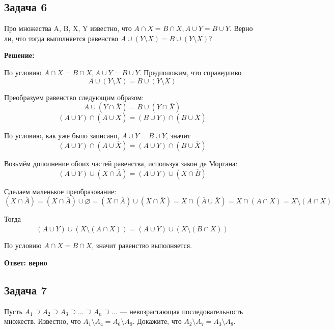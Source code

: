 \documentclass[a4paper,14pt]{article} %
\begin{document}
\newpage
\begin{center}
\subsection{Задача 6}
\end{center}

Про множества A, B, X, Y известно, что $A \cap X = B \cap X, A \cup Y = B \cup Y .$ Верно ли, что тогда выполняется равенство $A \cup (Y \setminus X) = B \cup (Y \setminus X)$?
\begin{center}
\bfseries
{\Large Решение: }
\end{center}


По условию $A\cap X = B\cap X, A\cup Y = B\cup Y$. Предположим, что справедливо
\[A \cup (Y \setminus X) = B \cup (Y \setminus X)\]

Преобразуем равенство следующим образом:
\[A \cup (Y \cap \overline{X}) = B \cup (Y \cap \overline{X})\]
\[(A \cup Y) \cap (A \cup \overline{X}) = (B \cup Y) \cap (B \cup \overline{X})\]

По условию, как уже было записано, $A\cup Y = B\cup Y$, значит
\[(A \cup Y) \cap (A \cup \overline{X}) = (A \cup Y) \cap (B \cup \overline{X})\]

Возьмём дополнение обоих частей равенства, используя закон де Моргана:
\[\overline{(A \cup Y)} \cup (X \cap \overline{A}) = \overline{(A \cup Y)} \cup (X \cap \overline{B})\]

Сделаем маленькое преобразование:
\[(X \cap \overline{A}) = (X \cap \overline{A})\cup \varnothing = (X \cap \overline{A})\cup (X \cap \overline{X}) = X \cap (\overline{A} \cup \overline{X}) = X \cap \overline{(A \cap X)} = X\setminus (A \cap X)\]

Тогда
\[\overline{(A \cup Y)} \cup (X\setminus (A \cap X)) = \overline{(A \cup Y)} \cup (X\setminus (B \cap X))\]

По условию $A\cap X = B\cap X$, значит равенство выполняется.

\begin{flushright}
\begin{large}
\textbf {Ответ: верно}
\end{large}
\end{flushright}

\newpage
\begin{center}
\subsection{Задача 7}
\end{center}
Пусть $A_{1} \supseteq A_{2} \supseteq A_{3} \supseteq \ldots \supseteq A_{n} \supseteq \ldots $ — невозрастающая последовательность множеств.
Известно, что $A_{1} \setminus A_{4} = A_{6} \setminus A_{9}$. Докажите, что $A_{2} \setminus A_{7} = A_{3} \setminus A_{8}$.
\end{document}

